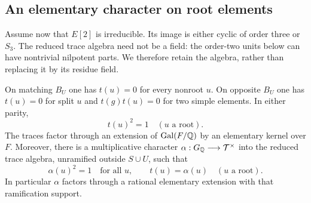 \subsection{An elementary character on root elements}

Assume now that $E[2]$ is irreducible.  Its image is either cyclic
of order three or $S_3$.  The reduced trace algebra need not be a
field: the order-two units below can have nontrivial nilpotent
parts.  We therefore retain the algebra, rather than replacing it
by its residue field.

\begin{lemma}
\label{tc:root-character}
On matching $B_U$ one has $t(u)=0$ for every nonroot $u$.
On opposite $B_U$ one has $t(u)=0$ for split $u$ and
$t(g)t(u)=0$ for two simple elements.  In either parity,
\[
                         t(u)^2=1\quad(u\text{ a root}).
\]
The traces factor through an extension of $\operatorname{Gal}(F/\mathbb Q)$ by an
elementary kernel over $F$.  Moreover, there is a multiplicative
character $\alpha:G_\mathbb Q\longrightarrow\mathcal T^\times$ into the
reduced trace algebra, unramified outside $S\cup U$, such that
\[
                  \alpha(u)^2=1\quad\text{for all }u,
 \qquad       t(u)=\alpha(u)\quad(u\text{ a root}).
\]
In particular $\alpha$ factors through a rational elementary
extension with that ramification support.
\end{lemma}

